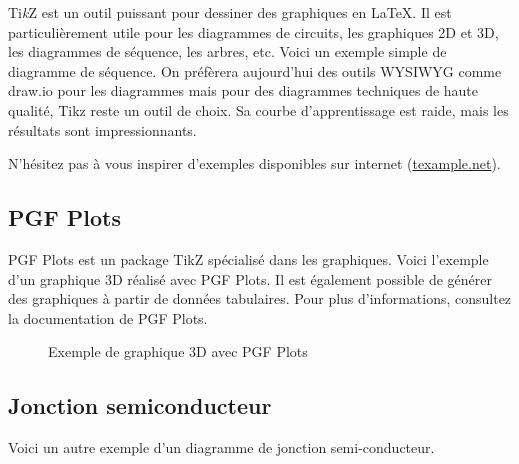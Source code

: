 Ti\textit{k}Z est un outil puissant pour dessiner des graphiques en \LaTeX. Il est particulièrement utile pour les diagrammes de circuits, les graphiques 2D et 3D, les diagrammes de séquence, les arbres, etc. Voici un exemple simple de diagramme de séquence. On préfèrera aujourd'hui des outils WYSIWYG comme draw.io pour les diagrammes mais pour des diagrammes techniques de haute qualité, Tikz reste un outil de choix. Sa courbe d'apprentissage est raide, mais les résultats sont impressionnants.

N'hésitez pas à vous inspirer d'exemples disponibles sur internet (\href{https://texample.net/category/science-technology/}{texample.net}).

\subsection{PGF Plots}

PGF Plots est un package TikZ spécialisé dans les graphiques. Voici l'exemple d'un graphique 3D réalisé avec PGF Plots. Il est également possible de générer des graphiques à partir de données tabulaires. Pour plus d'informations, consultez la documentation de PGF Plots.

\begin{figure}[H]
    \centering
    \caption{Exemple de graphique 3D avec PGF Plots}
\end{figure}

\subsection{Jonction semiconducteur}

Voici un autre exemple d'un diagramme de jonction semi-conducteur.

